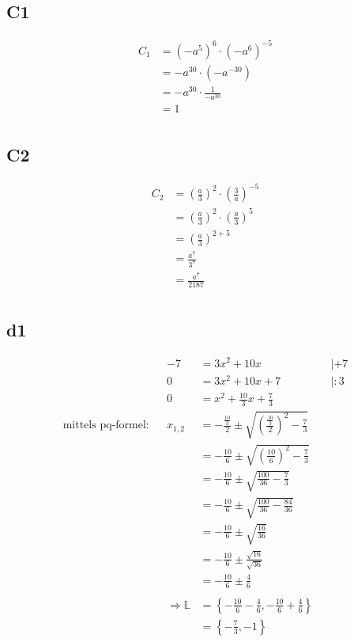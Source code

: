 \documentclass[]{article}
\newcommand{\rarr}{\Rightarrow}
\begin{document}
\subsection*{C1}
\begin{align*}
	&& C_1 &= (-a^5)^6 \cdot (-a^6)^{-5}&&\\
	&& &= -a^{30} \cdot (-a^{-30})&&\\
	&& &= -a^{30} \cdot \frac{1}{-a^{30}}&&\\
	&& &= 1 &&\\
\end{align*}
\subsection*{C2}
\begin{align*}
	&& C_2 &= (\frac{a}{3})^2 \cdot (\frac{3}{a})^{-5}&&\\
	&& &= (\frac{a}{3})^2 \cdot (\frac{a}{3})^{5}&&\\
	&& &= (\frac{a}{3})^{2+5}&&\\
	&& &= \frac{a^7}{3^7}&&\\
	&& &= \frac{a^7}{2187}&&\\
\end{align*}

\subsection*{d1}
\begin{align*}
	&& -7 &= 3x^2+10x &&| +7\\
	&& 0 &= 3x^2+10x +7 && | :3\\
	&& 0 &= x^2+\frac{10}{3}x +\frac{7}{3} &&\\
	\text{mittels pq-formel:}&& x_{1,2} &= -\frac{\frac{10}{3}}{2} \pm \sqrt{\left(\frac{\frac{10}{3}}{2}\right)^2 - \frac{7}{3}} &&\\
	&& &= -\frac{10}{6} \pm \sqrt{\left(\frac{10}{6}\right)^2 - \frac{7}{3}} &&\\
	&& &= -\frac{10}{6} \pm \sqrt{\frac{100}{36} - \frac{7}{3}} &&\\
	&& &= -\frac{10}{6} \pm \sqrt{\frac{100}{36} - \frac{84}{36}} &&\\
	&& &= -\frac{10}{6} \pm \sqrt{\frac{16}{36}} &&\\
	&& &= -\frac{10}{6} \pm \frac{\sqrt{16}}{\sqrt{36}} &&\\
	&& &= -\frac{10}{6} \pm \frac{4}{6} &&\\
	\\
	&& \rarr \mathbb{L} &= \left\{-\frac{10}{6} - \frac{4}{6}, -\frac{10}{6} + \frac{4}{6}\right\} &&\\
	&& &= \left\{-\frac{7}{3}, -1\right\} &&\\
\end{align*}
\end{document}
